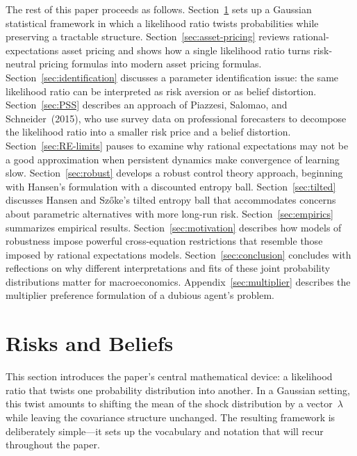 \documentclass[12pt]{article}
\theoremstyle{definition}
\begin{document}
The rest of this paper proceeds as follows.  Section~\ref{sec:risks-and-beliefs}
sets up a Gaussian statistical framework in which a likelihood ratio twists
probabilities while preserving a tractable structure.
Section~\ref{sec:asset-pricing} reviews rational-expectations asset
pricing and shows how a single likelihood ratio turns risk-neutral
pricing formulas into modern asset pricing formulas.
Section~\ref{sec:identification} discusses a parameter identification issue:
the same likelihood ratio can be interpreted as risk aversion or as
belief distortion. Section~\ref{sec:PSS} describes an approach of
Piazzesi, Salomao, and Schneider~(2015), who use survey data on
professional forecasters to decompose the likelihood ratio into a
smaller risk price and a belief distortion.
Section~\ref{sec:RE-limits} pauses to examine why rational expectations
may not be a good approximation when persistent dynamics make convergence
of learning slow.
Section~\ref{sec:robust} develops a robust control theory approach,
beginning with Hansen's formulation with a discounted entropy ball. Section~\ref{sec:tilted}
discusses Hansen and Sz\H{o}ke's tilted entropy ball that
accommodates concerns about parametric alternatives with more long-run
risk.  Section~\ref{sec:empirics} summarizes empirical results. Section~\ref{sec:motivation} describes how models 
of robustness impose powerful cross-equation restrictions that resemble those imposed by rational expectations models.
Section~\ref{sec:conclusion} concludes with reflections on why different interpretations and fits of these
joint probability distributions matter for macroeconomics. Appendix~\ref{sec:multiplier} describes the multiplier preference formulation of a dubious agent's problem.


\section{Risks and Beliefs}
\label{sec:risks-and-beliefs}

This section introduces the paper's central mathematical device: a
likelihood ratio that twists one probability distribution into another.
In a Gaussian setting, this twist amounts to shifting the mean of the
shock distribution by a vector~$\lambda$ while leaving the covariance
structure unchanged.  The resulting framework is deliberately
simple---it sets up the vocabulary and notation that will recur
throughout the paper.
\end{document}
